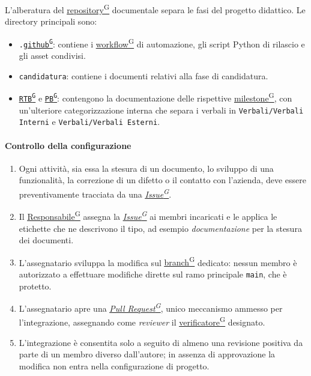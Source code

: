 \documentclass[a4paper,12pt]{article}
\providecommand{\glslink}[2]{\href{https://alittlebyte-19.github.io/Documentazione/glossario.html\#gls-#1}{\underline{#2}\textsuperscript{\scriptsize G}}}
\begin{document}
L'alberatura del \glslink{repository}{repository} documentale separa le fasi del progetto didattico. Le directory principali sono:
\begin{itemize}
    \item \texttt{.\glslink{github}{github}}: contiene i \glslink{workflow}{workflow} di automazione, gli script Python di rilascio e gli asset condivisi.
    \item \texttt{candidatura}: contiene i documenti relativi alla fase di candidatura.
    \item \texttt{\glslink{rtb-requirements-and-technology-baseline}{RTB}} e \texttt{\glslink{pb-product-baseline}{PB}}: contengono la documentazione delle rispettive \glslink{milestone}{milestone}, con un'ulteriore categorizzazione interna che separa i verbali in \texttt{Verbali/Verbali Interni} e \texttt{Verbali/Verbali Esterni}.
\end{itemize}

\paragraph{Controllo della configurazione}
\begin{enumerate}
    \item Ogni attività, sia essa la stesura di un documento, lo sviluppo di una funzionalità, la correzione di un difetto o il contatto con l'azienda, deve essere preventivamente tracciata da una \textit{\glslink{issue}{Issue}}.
    \item Il \glslink{responsabile}{Responsabile} assegna la \textit{\glslink{issue}{Issue}} ai membri incaricati e le applica le etichette che ne descrivono il tipo, ad esempio \textit{documentazione} per la stesura dei documenti.
    \item L'assegnatario sviluppa la modifica sul \glslink{branch}{branch} dedicato: nessun membro è autorizzato a effettuare modifiche dirette sul ramo principale \texttt{main}, che è protetto.
    \item L'assegnatario apre una \textit{\glslink{pull-request}{Pull Request}}, unico meccanismo ammesso per l'integrazione, assegnando come \textit{reviewer} il \glslink{verificatore}{verificatore} designato.
    \item L'integrazione è consentita solo a seguito di almeno una revisione positiva da parte di un membro diverso dall'autore; in assenza di approvazione la modifica non entra nella configurazione di progetto.
\end{enumerate}
\end{document}
